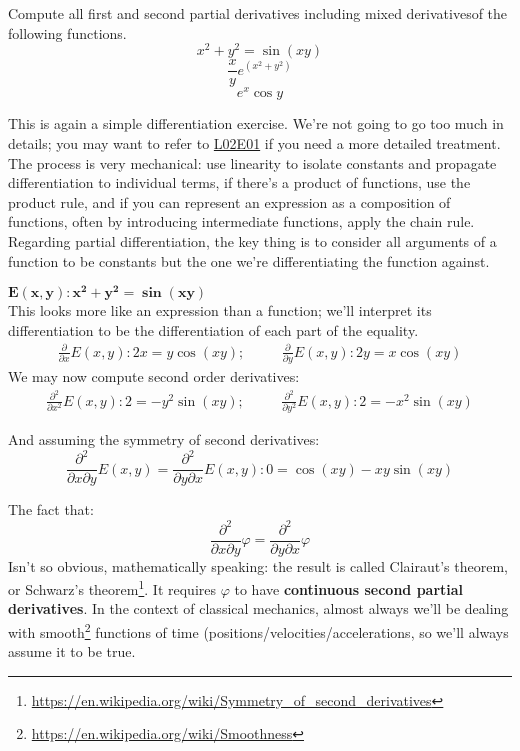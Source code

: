 \documentclass[solutions.tex]{subfiles}
\begin{document}
\maketitle
\begin{exercise} Compute all first and second partial derivatives
\textemdash including mixed derivatives\textemdash of the following
functions.
\[ x^2+y^2 = \sin(xy) \]
\[ \frac{x}ye^{(x^2+y^2)} \]
\[ e^x\cos y \]
\end{exercise}
This is again a simple differentiation exercise. We're not going to
go too much in details; you may want to refer to
\href{https://github.com/mbivert/ttm/blob/master/cm/L02E01.pdf}{L02E01}
if you need a more detailed treatment. The process is very mechanical:
use linearity to isolate constants and propagate differentiation to individual
terms, if there's a product of functions, use the product rule, and if
you can represent an expression as a composition of functions, often by
introducing intermediate functions, apply the chain rule. \\

Regarding partial differentiation, the key thing is to consider all
arguments of a function to be constants but the one we're differentiating
the function against.

\hr
$\bm{E(x,y): x^2+y^2 = \sin(xy)}$\\
This looks more like an expression than a function; we'll interpret
its differentiation to be the differentiation of each part of the equality.
\begin{equation*} \begin{aligned}
	\boxed{\frac{\partial}{\partial x}E(x,y) : 2x  =y\cos(xy);} &\quad&
	\boxed{\frac{\partial}{\partial y}E(x,y) : 2y  =x\cos(xy)}
\end{aligned} \end{equation*}
We may now compute second order derivatives:
\begin{equation*} \begin{aligned}
	\boxed{\frac{\partial^2}{\partial x^2}E(x,y) : 2  =-y^2\sin(xy);} &\quad&
	\boxed{\frac{\partial^2}{\partial y^2}E(x,y) : 2  =-x^2\sin(xy)}
\end{aligned} \end{equation*}

And assuming the symmetry of second derivatives:
\[
	\frac{\partial^2}{\partial x\partial y}E(x,y)
	= \frac{\partial^2}{\partial y\partial x} E(x,y) :
	\boxed{0  =\cos(xy)-xy\sin(xy)}
\]

\begin{remark} The fact that:
\[
	\frac{\partial^2}{\partial x\partial y}\varphi
	= \frac{\partial^2}{\partial y\partial x}\varphi
\]
Isn't so obvious, mathematically speaking: the result is called
Clairaut's theorem, or Schwarz's theorem\footnote{
\url{https://en.wikipedia.org/wiki/Symmetry\_of\_second\_derivatives}}.
It requires $\varphi$ to have \textbf{continuous second partial derivatives}.
In the context of classical mechanics, almost always we'll be dealing
with smooth\footnote{\url{https://en.wikipedia.org/wiki/Smoothness}}
functions of time (positions/velocities/accelerations, so we'll always
assume it to be true.
\end{remark}
\end{document}
